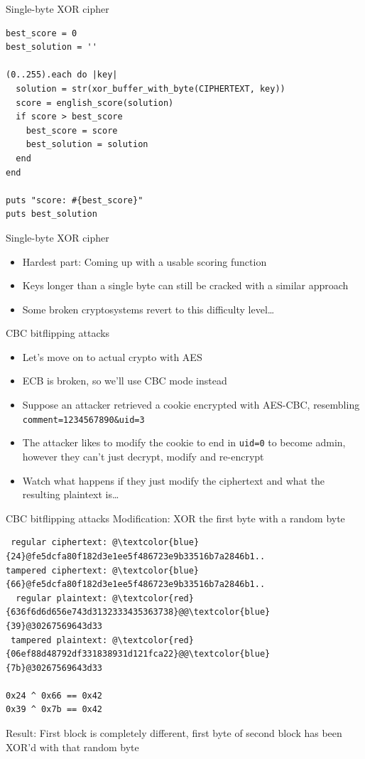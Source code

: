 \documentclass[presentation]{beamer}
\begin{document}
\begin{frame}[fragile,label={sec:orgeb89a37}]{Single-byte XOR cipher}
 \begin{verbatim}
best_score = 0
best_solution = ''

(0..255).each do |key|
  solution = str(xor_buffer_with_byte(CIPHERTEXT, key))
  score = english_score(solution)
  if score > best_score
    best_score = score
    best_solution = solution
  end
end

puts "score: #{best_score}"
puts best_solution
\end{verbatim}
\end{frame}

\begin{frame}[label={sec:org191e181}]{Single-byte XOR cipher}
\begin{itemize}
\item Hardest part: Coming up with a usable scoring function
\item Keys longer than a single byte can still be cracked with a similar
approach
\item Some broken cryptosystems revert to this difficulty level\ldots{}
\end{itemize}
\end{frame}

\begin{frame}[fragile,label={sec:org18ba1cf}]{CBC bitflipping attacks}
 \begin{itemize}
\item Let's move on to actual crypto with AES
\item ECB is broken, so we'll use CBC mode instead
\item Suppose an attacker retrieved a cookie encrypted with AES-CBC,
resembling \texttt{comment=1234567890\&uid=3}
\item The attacker likes to modify the cookie to end in \texttt{uid=0} to become
admin, however they can't just decrypt, modify and re-encrypt
\item Watch what happens if they just modify the ciphertext and what the
resulting plaintext is\ldots{}
\end{itemize}
\end{frame}

\begin{frame}[fragile,label={sec:orgd06e9f1}]{CBC bitflipping attacks}
 Modification: XOR the first byte with a random byte

\begin{verbatim}
 regular ciphertext: @\textcolor{blue}{24}@fe5dcfa80f182d3e1ee5f486723e9b33516b7a2846b1..
tampered ciphertext: @\textcolor{blue}{66}@fe5dcfa80f182d3e1ee5f486723e9b33516b7a2846b1..
  regular plaintext: @\textcolor{red}{636f6d6d656e743d3132333435363738}@@\textcolor{blue}{39}@30267569643d33
 tampered plaintext: @\textcolor{red}{06ef88d48792df331838931d121fca22}@@\textcolor{blue}{7b}@30267569643d33

0x24 ^ 0x66 == 0x42
0x39 ^ 0x7b == 0x42
\end{verbatim}

Result: First block is completely different, first byte of second
block has been XOR'd with that random byte
\end{frame}
\end{document}
